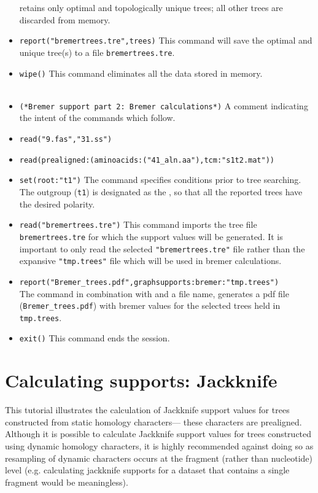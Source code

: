 \begin{itemize}
retains only optimal and topologically
 unique trees; all other trees are discarded from memory.
\item \texttt{report("bremertrees.tre",trees)} This command will
save the optimal and unique tree(s) to a file \texttt{bremertrees.tre}.  
\item \texttt{wipe()} This command eliminates all the data stored
in memory.  
\\ 
\\ 
\item \texttt{(*Bremer support part 2: Bremer calculations*)}  A comment
indicating the intent of the commands which follow.  
\item \texttt{read("9.fas","31.ss")} 
\item \texttt{read(prealigned:(aminoacids:("41\_aln.aa"),tcm:"s1t2.mat"))}
\item \texttt{set(root:"t1")} The  command
specifies conditions prior to tree searching. The outgroup (\texttt{t1})
is designated as the , so that all the reported
trees have the desired polarity.
\item \texttt{read("bremertrees.tre")} This command imports the
tree file \\ \texttt{bremertrees.tre} for which the support values
will be generated.  It is important to only read the selected
\texttt{"bremertrees.tre"} file rather than the expansive
\texttt{"tmp.trees"} file which will be used in bremer calculations.
\item \texttt{report("Bremer\_trees.pdf",graphsupports:bremer:"tmp.trees")}
\\The {} command in combination with
 and a file name, generates a pdf file
(\texttt{Bremer\_trees.pdf}) with bremer values for the selected
trees held in \texttt{tmp.trees}.  
\item \texttt{exit()} This command ends the \poy session.
\end{itemize}


\section{Calculating supports: Jackknife}{\label{tutorial5}}

This tutorial illustrates the calculation of Jackknife support 
values for trees constructed from static homology characters---
these characters are prealigned.  Although it is possible to 
calculate Jackknife support values for trees constructed 
using dynamic homology characters, it is highly recommended 
against doing so as resampling of dynamic characters occurs at 
the fragment (rather than nucleotide) level (e.g. calculating 
jackknife supports for a dataset that contains a single fragment 
would be meaningless). 

